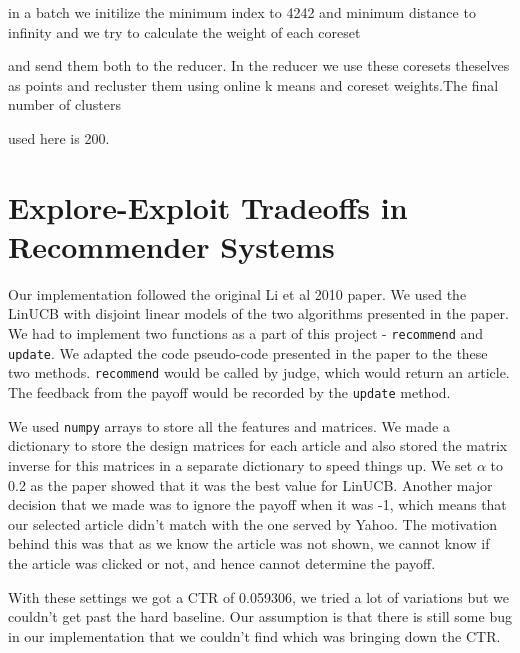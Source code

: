 \documentclass[a4paper, 11pt]{article}
\begin{document}
in a batch we initilize the minimum index to 4242 and minimum distance to infinity and we try to calculate the weight of each coreset

and send them both to the reducer. In the reducer we use these coresets theselves as points and recluster them using online k means and coreset weights.The final number of clusters

used here is 200.

\section{Explore-Exploit Tradeoffs in Recommender Systems}

Our implementation followed the original Li et al 2010 paper. We used the LinUCB with disjoint linear models of the two algorithms presented in the paper.
We had to implement two functions as a part of this project - \lstinline{recommend} and \lstinline{update}. We adapted the code pseudo-code presented in the
paper to the these two methods. \lstinline{recommend} would be called by judge, which would return an article. The feedback from the payoff would be recorded
by the \lstinline{update} method.

We used \lstinline{numpy} arrays to store all the features and matrices. We made a dictionary to store the design matrices for each article and also stored
the matrix inverse for this matrices in a separate dictionary to speed things up. We set $\alpha$ to 0.2 as the paper showed that it was the best value for LinUCB.
Another major decision that we made was to ignore the payoff when it was -1, which means that our selected article didn't match with the one served by
Yahoo. The motivation behind this was that as we know the article was not shown, we cannot know if the article was clicked or not, and hence cannot determine
the payoff.

With these settings we got a CTR of 0.059306, we tried a lot of variations but we couldn't get past the hard baseline. Our assumption is that there is still
some bug in our implementation that we couldn't find which was bringing down the CTR.
\end{document}
